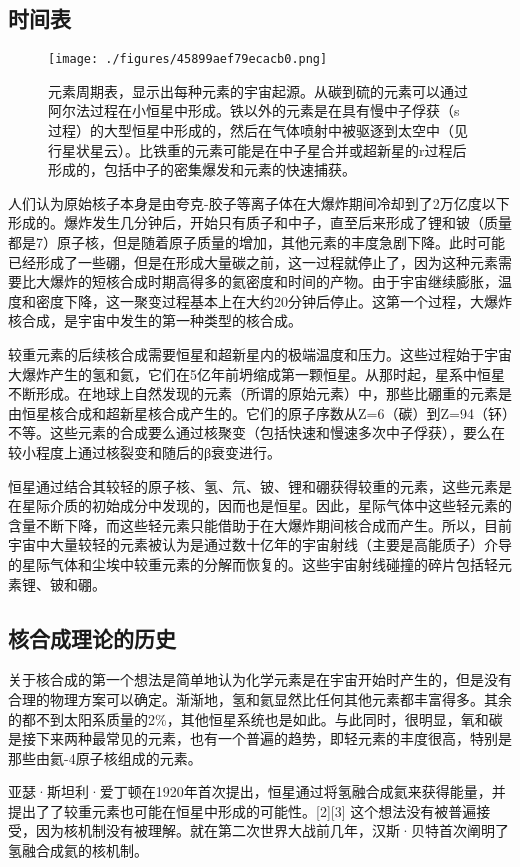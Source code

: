 \subsection{时间表}
\begin{figure}[ht]
\centering
\texttt{[image: ./figures/45899aef79ecacb0.png]}
\caption{元素周期表，显示出每种元素的宇宙起源。从碳到硫的元素可以通过阿尔法过程在小恒星中形成。铁以外的元素是在具有慢中子俘获（s过程）的大型恒星中形成的，然后在气体喷射中被驱逐到太空中（见行星状星云）。比铁重的元素可能是在中子星合并或超新星的r过程后形成的，包括中子的密集爆发和元素的快速捕获。} \label{fig_HHC_1}
\end{figure}
人们认为原始核子本身是由夸克-胶子等离子体在大爆炸期间冷却到了2万亿度以下形成的。爆炸发生几分钟后，开始只有质子和中子，直至后来形成了锂和铍（质量都是7）原子核，但是随着原子质量的增加，其他元素的丰度急剧下降。此时可能已经形成了一些硼，但是在形成大量碳之前，这一过程就停止了，因为这种元素需要比大爆炸的短核合成时期高得多的氦密度和时间的产物。由于宇宙继续膨胀，温度和密度下降，这一聚变过程基本上在大约20分钟后停止。这第一个过程，大爆炸核合成，是宇宙中发生的第一种类型的核合成。

较重元素的后续核合成需要恒星和超新星内的极端温度和压力。这些过程始于宇宙大爆炸产生的氢和氦，它们在5亿年前坍缩成第一颗恒星。从那时起，星系中恒星不断形成。在地球上自然发现的元素（所谓的原始元素）中，那些比硼重的元素是由恒星核合成和超新星核合成产生的。它们的原子序数从Z=6（碳）到Z=94（钚）不等。这些元素的合成要么通过核聚变（包括快速和慢速多次中子俘获），要么在较小程度上通过核裂变和随后的β衰变进行。

恒星通过结合其较轻的原子核、氢、氘、铍、锂和硼获得较重的元素，这些元素是在星际介质的初始成分中发现的，因而也是恒星。因此，星际气体中这些轻元素的含量不断下降，而这些轻元素只能借助于在大爆炸期间核合成而产生。所以，目前宇宙中大量较轻的元素被认为是通过数十亿年的宇宙射线（主要是高能质子）介导的星际气体和尘埃中较重元素的分解而恢复的。这些宇宙射线碰撞的碎片包括轻元素锂、铍和硼。

\subsection{核合成理论的历史}
关于核合成的第一个想法是简单地认为化学元素是在宇宙开始时产生的，但是没有合理的物理方案可以确定。渐渐地，氢和氦显然比任何其他元素都丰富得多。其余的都不到太阳系质量的2\%，其他恒星系统也是如此。与此同时，很明显，氧和碳是接下来两种最常见的元素，也有一个普遍的趋势，即轻元素的丰度很高，特别是那些由氦-4原子核组成的元素。

亚瑟·斯坦利·爱丁顿在1920年首次提出，恒星通过将氢融合成氦来获得能量，并提出了了较重元素也可能在恒星中形成的可能性。[2][3] 这个想法没有被普遍接受，因为核机制没有被理解。就在第二次世界大战前几年，汉斯·贝特首次阐明了氢融合成氦的核机制。

